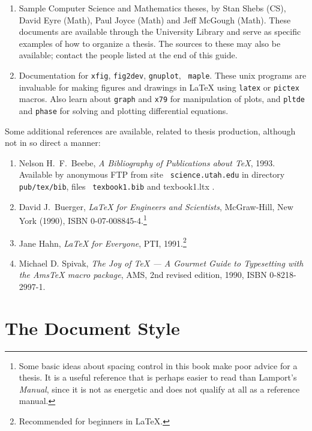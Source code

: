\begin{enumerate}
\item Sample Computer Science and Mathematics theses, by Stan Shebs
(CS), David Eyre (Math), Paul Joyce (Math) and Jeff McGough (Math).
These documents are available through the University Library and serve
as specific examples of how to organize a thesis. The sources to these
may also be available; contact the people listed at the end of this
guide.

\item Documentation for {\tt xfig}, {\tt fig2dev}, {\tt gnuplot}, {\tt
maple}. These unix programs are invaluable for making figures and
drawings in \LaTeX{} using {\tt latex} or {\tt pictex} macros. Also
learn about {\tt graph} and {\tt x79} for manipulation of plots, and
{\tt pltde} and {\tt phase} for solving and plotting differential
equations.

\end{enumerate}

Some additional references are available, related to thesis production,
although not in so direct a manner:

\begin{enumerate}
\item Nelson H.\ F.\ Beebe, {\em A Bibliography of Publications about
\TeX{}}, 1993. {\footnotesize Available by anonymous FTP from site {\tt
science.utah.edu} in directory {\tt pub/tex/bib}, files {\tt
texbook1.bib} and {texbook1.ltx}} .

\item David J.\ Buerger, {\em {\LaTeX{}} for Engineers and Scientists},
McGraw-Hill, New York (1990), ISBN 0-07-008845-4.\footnote{ Some basic
ideas about spacing control in this book make poor advice for a thesis.
It is a useful reference that is perhaps easier to read than Lamport's
{\em Manual}, since it is not as energetic and does not qualify at all
as a reference manual.}

\item Jane Hahn, {\em {\LaTeX{}} for Everyone}, PTI, 1991.\footnote{
Recommended for beginners in \LaTeX{}.}

\item Michael D. Spivak, {\em The Joy of {\TeX} --- A Gourmet Guide to
Typesetting with the {AmsTeX} macro package}, AMS, 2nd revised edition,
1990, ISBN 0-8218-2997-1.

\end{enumerate}

\section{The Document Style}

